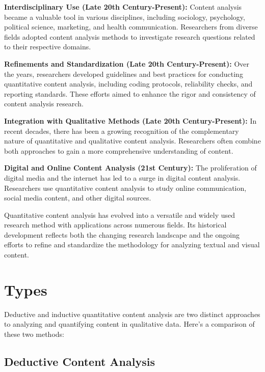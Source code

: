 \documentclass[
  b5paper]{book}
\begin{document}
\textbf{Interdisciplinary Use (Late 20th Century-Present):} Content analysis became a valuable tool in various disciplines, including sociology, psychology, political science, marketing, and health communication. Researchers from diverse fields adopted content analysis methods to investigate research questions related to their respective domains.

\textbf{Refinements and Standardization (Late 20th Century-Present):} Over the years, researchers developed guidelines and best practices for conducting quantitative content analysis, including coding protocols, reliability checks, and reporting standards. These efforts aimed to enhance the rigor and consistency of content analysis research.

\textbf{Integration with Qualitative Methods (Late 20th Century-Present):} In recent decades, there has been a growing recognition of the complementary nature of quantitative and qualitative content analysis. Researchers often combine both approaches to gain a more comprehensive understanding of content.

\textbf{Digital and Online Content Analysis (21st Century):} The proliferation of digital media and the internet has led to a surge in digital content analysis. Researchers use quantitative content analysis to study online communication, social media content, and other digital sources.

Quantitative content analysis has evolved into a versatile and widely used research method with applications across numerous fields. Its historical development reflects both the changing research landscape and the ongoing efforts to refine and standardize the methodology for analyzing textual and visual content.

\hypertarget{types}{%
\section{Types}\label{types}}

Deductive and inductive quantitative content analysis are two distinct approaches to analyzing and quantifying content in qualitative data. Here's a comparison of these two methods:

\hypertarget{deductive-content-analysis}{%
\subsection*{Deductive Content Analysis}\label{deductive-content-analysis}}
\end{document}
